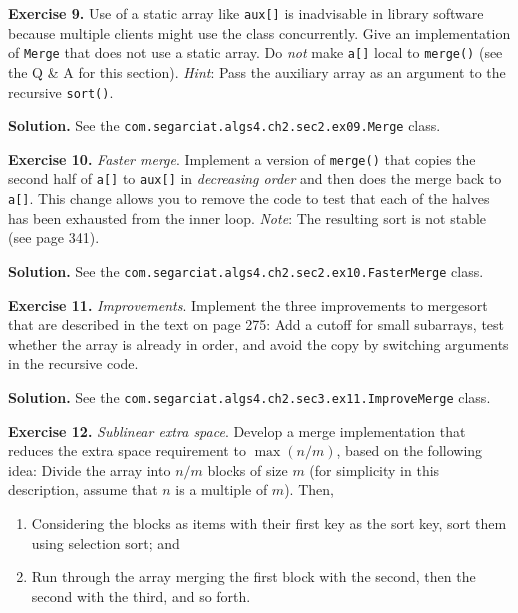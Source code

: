 \documentclass[12pt, a4paper]{article}
\newenvironment{ex}[2][Exercise]
{\par\medskip\noindent \textbf{#1 #2.}}
{\medskip}
\newenvironment{sol}[1][Solution]
{\par\medskip\noindent \textbf{#1.} }
{\medskip}
\begin{document}
	\begin{ex}{9}
		Use of a static array like \texttt{aux[]} is inadvisable in library software because
		multiple clients might use the class concurrently. Give an implementation of \texttt{Merge}
		that does not use a static array. Do \emph{not} make \texttt{a[]} local to \texttt{merge()}
		(see the Q \& A for this section).
		\emph{Hint}: Pass the auxiliary array as an argument to the recursive \texttt{sort()}.
	\end{ex}
	\begin{sol}
		See the \texttt{com.segarciat.algs4.ch2.sec2.ex09.Merge} class.
	\end{sol}
	\begin{ex}{10}
		\emph{Faster merge}. Implement a version of \texttt{merge()} that copies the second half of
		\texttt{a[]} to \texttt{aux[]} in \emph{decreasing order} and then does the merge back to \texttt{a[]}.
		This change allows you to remove the code to test that each of the halves has been
		exhausted from the inner loop. \emph{Note}: The resulting sort is not stable
		(see page 341).
	\end{ex}
	\begin{sol}
		See the \texttt{com.segarciat.algs4.ch2.sec2.ex10.FasterMerge} class.
	\end{sol}
	\begin{ex}{11}
		\emph{Improvements}. Implement the three improvements to mergesort that are described
		in the text on page 275: Add a cutoff for small subarrays, test whether the array
		is already in order, and avoid the copy by switching arguments in the recursive code.
	\end{ex}
	\begin{sol}
		See the \texttt{com.segarciat.algs4.ch2.sec3.ex11.ImproveMerge} class.
	\end{sol}
	\begin{ex}{12}
		\emph{Sublinear extra space}. Develop a merge implementation that reduces the extra
		space requirement to $\max(n/m)$, based on the following idea: Divide the array into
		$n/m$ blocks of size $m$ (for simplicity in this description, assume that $n$ is a
		multiple of $m$). Then,
		\begin{enumerate}[label=(\roman*)]
			\item Considering the blocks as items with their first key as the sort key,
			sort them using selection sort; and
			\item Run through the array merging the first block with the second, then the
			second with the third, and so forth.
		\end{enumerate}
	\end{ex}
\end{document}
